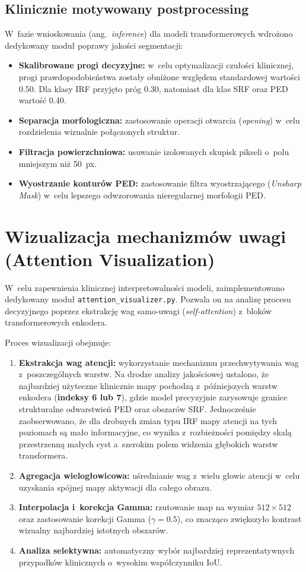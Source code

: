 \documentclass[12pt,a4paper,oneside]{report}
\begin{document}
\subsection{Klinicznie motywowany postprocessing}
W~fazie wnioskowania (ang.~\textit{inference}) dla modeli transformerowych wdrożono dedykowany moduł poprawy jakości segmentacji:
\begin{itemize}
 \item \textbf{Skalibrowane progi decyzyjne:} w~celu optymalizacji czułości klinicznej, progi prawdopodobieństwa zostały obniżone względem standardowej wartości 0.50. Dla klasy IRF przyjęto próg 0.30, natomiast dla klas SRF oraz PED wartość 0.40.
 \item \textbf{Separacja morfologiczna:} zastosowanie operacji otwarcia (\textit{opening}) w~celu rozdzielenia wizualnie połączonych struktur.
 \item \textbf{Filtracja powierzchniowa:} usuwanie izolowanych skupisk pikseli o~polu mniejszym niż 50~px.
 \item \textbf{Wyostrzanie konturów PED:} zastosowanie filtra wyostrzającego (\textit{Unsharp Mask}) w~celu lepszego odwzorowania nieregularnej morfologii PED.
\end{itemize}

\section{Wizualizacja mechanizmów uwagi (Attention Visualization)}

W~celu zapewnienia klinicznej interpretowalności modeli, zaimplementowano dedykowany moduł \texttt{attention\_visualizer.py}. Pozwala on na analizę procesu decyzyjnego poprzez ekstrakcję wag samo-uwagi (\textit{self-attention}) z~bloków transformerowych enkodera.

Proces wizualizacji obejmuje:
\begin{enumerate}
 \item \textbf{Ekstrakcja wag atencji:} wykorzystanie mechanizmu przechwytywania wag z~poszczególnych warstw. Na drodze analizy jakościowej ustalono, że najbardziej użyteczne klinicznie mapy pochodzą z~późniejszych warstw enkodera (\textbf{indeksy 6 lub 7}), gdzie model precyzyjnie zarysowuje granice strukturalne odwarstwień PED oraz obszarów SRF. Jednocześnie zaobserwowano, że dla drobnych zmian typu IRF mapy atencji na tych poziomach są mało informacyjne, co wynika z~rozbieżności pomiędzy skalą przestrzenną małych cyst a~szerokim polem widzenia głębokich warstw transformera.
 \item \textbf{Agregacja wielogłowicowa:} uśrednianie wag z~wielu głowic atencji w~celu uzyskania spójnej mapy aktywacji dla całego obrazu.
 \item \textbf{Interpolacja i~korekcja Gamma:} rzutowanie map na wymiar $512 \times 512$ oraz zastosowanie korekcji Gamma ($\gamma=0.5$), co znacząco zwiększyło kontrast wizualny najbardziej istotnych obszarów.
 \item \textbf{Analiza selektywna:} automatyczny wybór najbardziej reprezentatywnych przypadków klinicznych o~wysokim współczynniku IoU.
\end{enumerate}
\end{document}
